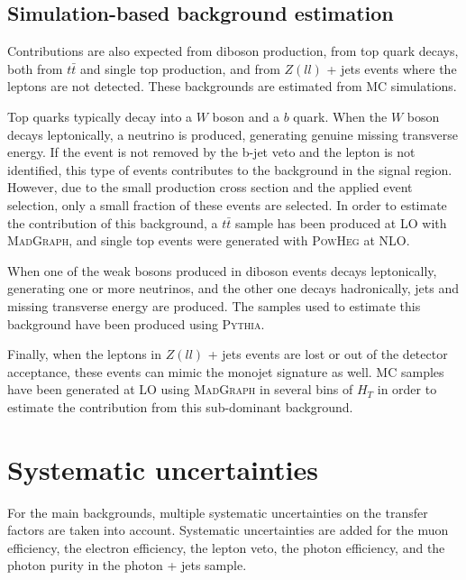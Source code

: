 
\subsection{Simulation-based background estimation}

Contributions are also expected from diboson production, from top quark decays, both from $t\bar{t}$ and single top production, and from $Z(ll)$ + jets events where the leptons are not detected. These backgrounds are estimated from MC simulations. 

Top quarks typically decay into a $W$ boson and a $b$ quark. When the $W$ boson decays leptonically, a neutrino is produced, generating genuine missing transverse energy. If the event is not removed by the b-jet veto and the lepton is not identified, this type of events contributes to the background in the signal region. However, due to the small production cross section and the applied event selection, only a small fraction of these events are selected. In order to estimate the contribution of this background, a $t\bar{t}$ sample has been produced at \ac{LO} with \textsc{MadGraph}, and single top events were generated with \textsc{PowHeg} at \ac{NLO}.

When one of the weak bosons produced in diboson events decays leptonically, generating one or more neutrinos, and the other one decays hadronically, jets and missing transverse energy are produced. The samples used to estimate this background have been produced using \textsc{Pythia}.

Finally, when the leptons in $Z(ll)$ + jets events are lost or out of the detector acceptance, these events can mimic the monojet signature as well. MC samples have been generated at \ac{LO} using \textsc{MadGraph} in several bins of $H_T$ in order to estimate the contribution from this sub-dominant background.

\section{Systematic uncertainties}
\label{sec:syst}

For the main backgrounds, multiple systematic uncertainties on the transfer factors are taken into account. Systematic uncertainties are added for the muon efficiency, the electron efficiency, the lepton veto, the photon efficiency, and the photon purity in the photon + jets sample. 

